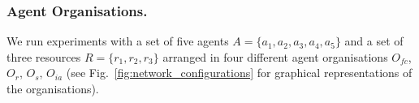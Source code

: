 \documentclass{llncs}
\begin{document}
\subsubsection{Agent Organisations.}
We run experiments with a set of five agents $A= \{ a_1,a_2,a_3,a_4,a_5 \} $ and a set of  three resources $R=\{r_1,r_2,r_3\}$ arranged in four different agent organisations $O_{fc}$, $O_{r}$, $O_{s}$, $O_{ia}$ (see Fig.~\ref{fig:network_configurations} for graphical representations of the organisations).
\end{document}
